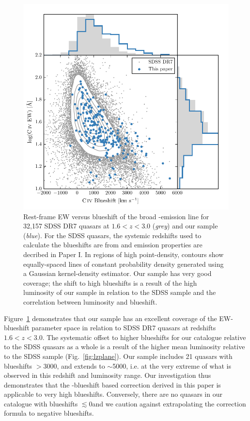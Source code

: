 \begin{figure}
    \includegraphics[width=\columnwidth]{figures/chapter03/civ_space.pdf} 
    \caption{Rest-frame EW versus blueshift of the broad -emission line for 32,157 SDSS DR7 quasars at $1.6 < z < 3.0$ ({\it grey}) and our sample ({\it blue}). For the SDSS quasars, the systemic redshifts used to calculate the blueshifts are from \citet{hewett10} and  emission properties are decribed in Paper I. In regions of high point-density, contours show equally-spaced lines of constant probability density generated using a Gaussian kernel-density estimator. Our sample has very good coverage; the shift to high blueshifts is a result of the high luminosity of our sample in relation to the SDSS sample and the correlation between luminosity and blueshift.} 
    \label{fig:civ_space}
\end{figure}

Figure~\ref{fig:civ_space} demonstrates that our sample has an excellent coverage of the EW-blueshift parameter space in relation to SDSS DR7 quasars at redshifts $1.6 < z < 3.0$. 
The systematic offset to higher  blueshifts for our catalogue relative to the SDSS quasars as a whole is a result of the higher mean luminosity relative to the SDSS sample (Fig.~\ref{fig:lzplane}).
Our sample includes 21 quasars with  blueshifts $>$3000\kms, and extends to $\sim$5000\kms, i.e. at the very extreme of what is observed in this redshift and luminosity range. 
Our investigation thus demonstrates that the -blueshift based correction derived in this paper is applicable to very high blueshifts. 
Conversely, there are no quasars in our catalogue with  blueshifts $\lesssim$0\kms and we caution against extrapolating the correction formula to negative blueshifts. 

